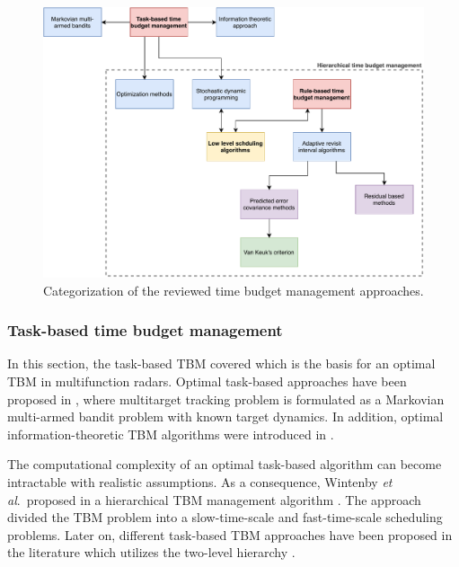\documentclass[english, 12pt, a4paper, elec, utf8, a-1b, online]{aaltothesis}
\newcommand{\etal}{\textit{et al}.~}
\begin{document}
\begin{figure}[h]
    \centering
    \includegraphics[width=\textwidth]{figures/TBM_algorithms.pdf}
    \caption{Categorization of the reviewed time budget management approaches.}
    \label{fig:tbm_categorization}
\end{figure}

\subsubsection{Task-based time budget management}

In this section, the task-based TBM covered which is the basis for an optimal TBM in multifunction radars.
Optimal task-based approaches have been proposed in \cite{Krishnamurthy1999, Krishnamurthy2001}, where multitarget tracking problem is formulated as a Markovian multi-armed bandit problem with known target dynamics.  
In addition, optimal information-theoretic TBM algorithms were introduced in \cite{Kastella1997, Kreucher2004, Kreucher2005, Xu2010}.

The computational complexity of an optimal task-based algorithm can become intractable with realistic assumptions. 
As a consequence, Wintenby \etal proposed in \cite{Wintenby2006} a hierarchical TBM management algorithm \cite{Wintenby2006}.
The approach divided the TBM problem into a slow-time-scale and fast-time-scale scheduling problems.
Later on, different task-based TBM approaches have been proposed in the literature which utilizes the two-level hierarchy \cite{Byrne2015, Byrne2016, Esfahani2012}.
\end{document}
